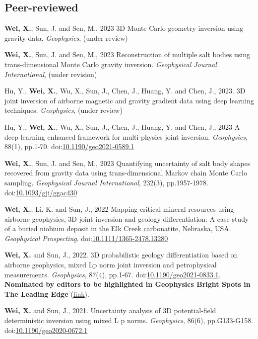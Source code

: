 \documentclass[11pt, a4paper]{article}
\newcommand{\LastName}{Wei}
\newcommand{\Initials}{X}
\newcommand{\Wei}{\textbf{\LastName, \Initials.}}  %
\newcommand{\WeiSun}{\textbf{\LastName, \Initials.} and Sun, J.}  %
\newcommand{\Review}{under review}
\newcommand{\Revision}{under revision}
\newcommand{\DOI}[1]{doi:\href{https://doi.org/#1}{#1}}
\begin{document}
\subsection*{Peer-reviewed}
\begin{etaremune}
		
	\item
	\Wei, Sun, J. and Sen, M., 2023 3D Monte Carlo geometry inversion using gravity data. \emph{Geophysics}, (\Review)
	
	\item
	\Wei, Sun, J. and Sen, M., 2023 Reconstruction of multiple salt bodies using trans-dimensional Monte Carlo gravity inversion. \emph{Geophysical Journal International}, (\Revision)
	
	\item
	Hu, Y., \Wei, Wu, X., Sun, J., Chen, J., Huang, Y. and Chen, J., 2023. 3D joint inversion of airborne magnetic and gravity gradient data using deep learning techniques. \emph{Geophysics}, (\Review)
	
	\item
	Hu, Y., \Wei, Wu, X., Sun, J., Chen, J., Huang, Y. and Chen, J., 2023 A deep learning enhanced framework for multi-physics joint inversion. \emph{Geophysics}, 88(1), pp.1-70. \DOI{10.1190/geo2021-0589.1}
	
	\item
	\Wei, Sun, J. and Sen, M., 2023 Quantifying uncertainty of salt body shapes recovered from gravity data using trans-dimensional Markov chain Monte Carlo sampling. \emph{Geophysical Journal International}, 232(3), pp.1957-1978. \DOI{10.1093/gji/ggac430}

	\item
	\Wei, Li, K. and Sun, J., 2022 Mapping critical mineral resources using airborne geophysics, 3D joint inversion and geology differentiation: A case study of a buried niobium deposit in the Elk Creek carbonatite, Nebraska, USA. \emph{Geophysical Prospecting}. \DOI{10.1111/1365-2478.13280}

	\item
	\WeiSun, 2022. 3D probabilistic geology differentiation based on airborne geophysics, mixed Lp norm joint inversion and petrophysical measurements. \emph{Geophysics}, 87(4), pp.1-67.
	\DOI{10.1190/geo2021-0833.1}. \textbf{Nominated by editors to be highlighted in Geophysics Bright Spots in The Leading Edge }(\href{https://library.seg.org/doi/epub/10.1190/tle41100730.1}{link}).
	\item
	\WeiSun, 2021. Uncertainty analysis of 3D potential-field deterministic inversion using mixed L p norms. \emph{Geophysics}, 86(6), pp.G133-G158.
	\DOI{10.1190/geo2020-0672.1}


\end{etaremune}
\end{document}
